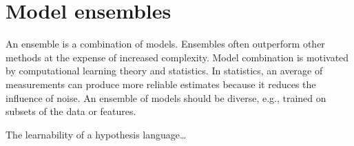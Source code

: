 \section{Model ensembles}

An ensemble is a combination of models.
Ensembles often outperform other methods at the expense of increased
complexity.
Model combination is motivated by computational learning theory and statistics.
In statistics, an average of measurements can produce more reliable estimates
because it reduces the influence of noise.
An ensemble of models should be diverse, e.g., trained on subsets of the data
or features.

The learnability of a hypothesis language\dots